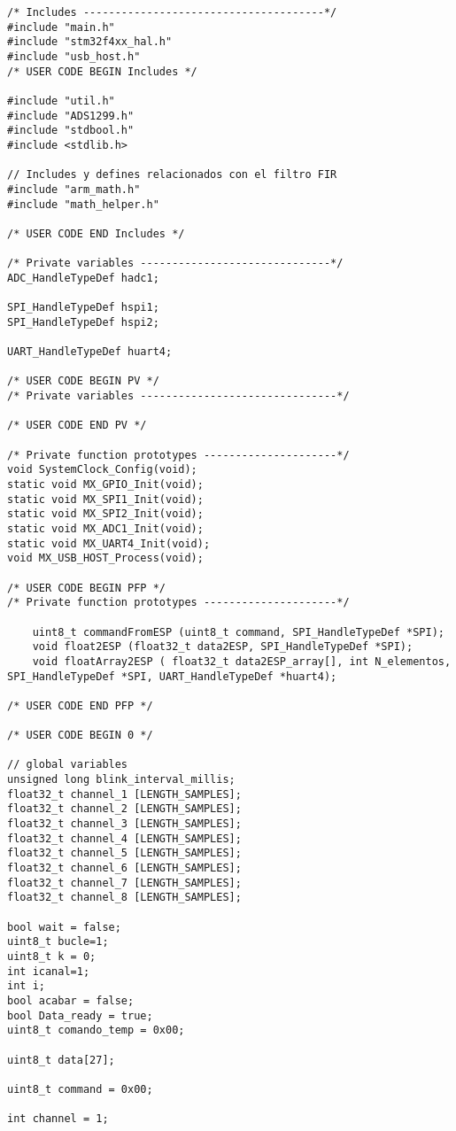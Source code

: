 \begin{lstlisting}[label=algoritmo:STM32F4:main.c,style = STM-code,frame=single,caption=STM32F4:main.c]
/* Includes --------------------------------------*/
#include "main.h"
#include "stm32f4xx_hal.h"
#include "usb_host.h"
/* USER CODE BEGIN Includes */

#include "util.h"
#include "ADS1299.h"
#include "stdbool.h"
#include <stdlib.h>

// Includes y defines relacionados con el filtro FIR
#include "arm_math.h"
#include "math_helper.h"

/* USER CODE END Includes */

/* Private variables ------------------------------*/
ADC_HandleTypeDef hadc1;

SPI_HandleTypeDef hspi1;
SPI_HandleTypeDef hspi2;

UART_HandleTypeDef huart4;

/* USER CODE BEGIN PV */
/* Private variables -------------------------------*/

/* USER CODE END PV */

/* Private function prototypes ---------------------*/
void SystemClock_Config(void);
static void MX_GPIO_Init(void);
static void MX_SPI1_Init(void);
static void MX_SPI2_Init(void);
static void MX_ADC1_Init(void);
static void MX_UART4_Init(void);
void MX_USB_HOST_Process(void);

/* USER CODE BEGIN PFP */
/* Private function prototypes ---------------------*/

	uint8_t commandFromESP (uint8_t command, SPI_HandleTypeDef *SPI);
	void float2ESP (float32_t data2ESP, SPI_HandleTypeDef *SPI);
	void floatArray2ESP ( float32_t data2ESP_array[], int N_elementos, SPI_HandleTypeDef *SPI, UART_HandleTypeDef *huart4);

/* USER CODE END PFP */

/* USER CODE BEGIN 0 */

// global variables
unsigned long blink_interval_millis;
float32_t channel_1 [LENGTH_SAMPLES];
float32_t channel_2 [LENGTH_SAMPLES];
float32_t channel_3 [LENGTH_SAMPLES];
float32_t channel_4 [LENGTH_SAMPLES];
float32_t channel_5 [LENGTH_SAMPLES];
float32_t channel_6 [LENGTH_SAMPLES];
float32_t channel_7 [LENGTH_SAMPLES];
float32_t channel_8 [LENGTH_SAMPLES];

bool wait = false;
uint8_t bucle=1;
uint8_t k = 0;
int icanal=1;
int i;
bool acabar = false;
bool Data_ready = true;
uint8_t comando_temp = 0x00;

uint8_t data[27];

uint8_t command = 0x00;

int channel = 1;


\end{lstlisting}
